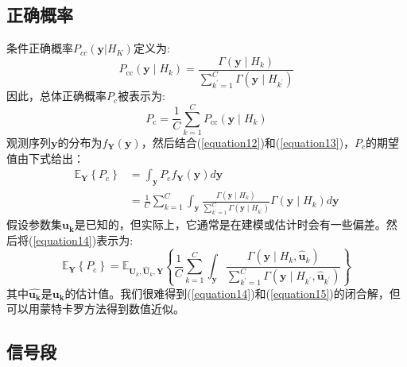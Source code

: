 \documentclass[final]{cvpr}
\begin{document}
\subsection{正确概率}\label{sec:CorrectPro}

条件正确概率$P_{cc}(\mathbf{y}|H_K)$定义为:
\begin{equation}
P_{\mathrm{cc}}\left(\mathbf{y} \mid H_{k}\right)=\frac{\Gamma\left(\mathbf{y} \mid H_{k}\right)}{\sum_{k^{\prime}=1}^{C} \Gamma\left(\mathbf{y} \mid H_{k^{\prime}}\right)}\label{equation12}
\end{equation}
因此，总体正确概率$P_c$被表示为:
\begin{equation}
P_{\mathrm{c}}=\frac{1}{C} \sum_{k=1}^{C} P_{\mathrm{cc}}\left(\mathbf{y} \mid H_{k}\right)\label{equation13}
\end{equation}
观测序列$\mathbf{y}$的分布为$f_\mathbf{Y}(\mathbf{y})$，然后结合(\ref{equation12})和(\ref{equation13})，$P_c$的期望值由下式给出：
\begin{equation}
\begin{aligned}
\mathbb{E}_{\mathbf{Y}}\left\{P_{\mathrm{c}}\right\} &=\int_{\mathbf{y}} P_{\mathrm{c}} f_{\mathbf{Y}}(\mathbf{y}) d \mathbf{y} \\
&=\frac{1}{C} \sum_{k=1}^{C} \int_{\mathbf{y}} \frac{\Gamma\left(\mathbf{y} \mid H_{k}\right)}{\sum_{k^{\prime}=1}^{C} \Gamma\left(\mathbf{y} \mid H_{k^{\prime}}\right)} \Gamma\left(\mathbf{y} \mid H_{k}\right) d \mathbf{y} \label{equation14}
\end{aligned}
\end{equation}
假设参数集$\mathbf{u_k}$是已知的，但实际上，它通常是在建模或估计时会有一些偏差。然后将(\ref{equation14})表示为:
\begin{equation}
\mathbb{E}_{\mathbf{Y}}\left\{P_{\mathrm{c}}\right\}=\mathbb{E}_{\mathbf{U}_{k}, \hat{\mathbf{U}}_{k}, \mathbf{Y}}\left\{\frac{1}{C} \sum_{k=1}^{C} \int_{\mathbf{y}} \frac{\Gamma\left(\mathbf{y} \mid H_{k}, \hat{\mathbf{u}}_{k}\right)}{\sum_{k^{\prime}=1}^{C} \Gamma\left(\mathbf{y} \mid H_{k^{\prime}}, \hat{\mathbf{u}}_{k^{\prime}}\right)}\right\}\label{equation15}
\end{equation}
其中$\widehat{\mathbf{u_k}}$是$\mathbf{u_k}$的估计值。我们很难得到(\ref{equation14})和(\ref{equation15})的闭合解，但可以用蒙特卡罗方法得到数值近似。
\subsection{信号段}\label{sec:SignalSeg}
\end{document}
